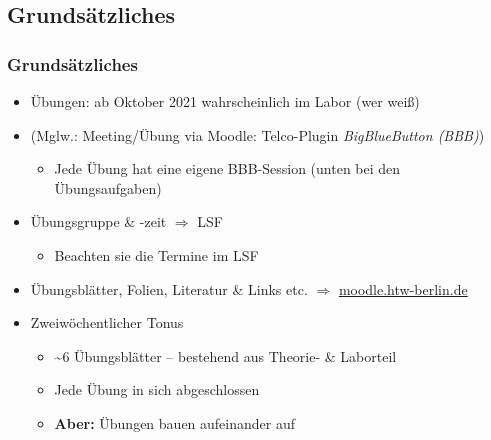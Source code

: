 \documentclass[xcolor=dvipsnames,aspectratio=169]{beamer}
\begin{document}
\subsection{Grundsätzliches}
\begin{frame}
	\frametitle{Grundsätzliches}
	\begin{itemize}
		\item Übungen: ab Oktober 2021 wahrscheinlich im Labor (wer weiß)
		\item (Mglw.: Meeting/Übung via Moodle: Telco-Plugin \emph{BigBlueButton (BBB)})
		\begin{itemize}
			\item Jede Übung hat eine eigene BBB-Session (unten bei den Übungsaufgaben)
		\end{itemize}
		\item Übungsgruppe \& -zeit $\Rightarrow$ LSF
		\begin{itemize}
			\item Beachten sie die Termine im LSF
		\end{itemize}
		\item Übungsblätter, Folien, Literatur \& Links etc. $\Rightarrow$ \url{moodle.htw-berlin.de}
		\item Zweiwöchentlicher Tonus 
		\begin{itemize}
			\item \textasciitilde 6 Übungsblätter -- bestehend aus Theorie- \& Laborteil
			\item Jede Übung in sich abgeschlossen
			\item \textbf{Aber:} Übungen bauen aufeinander auf
		\end{itemize}
	\end{itemize}
\end{frame}
\end{document}

